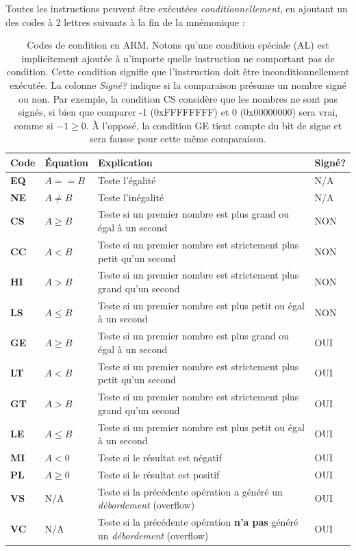 \documentclass{tufte-handout}
\begin{document}
\noindent Toutes les instructions peuvent être exécutées \emph{conditionnellement}, en ajoutant un des codes à 2 lettres suivants à la fin de la mnémonique :
\vspace{-0.8em}
\begin{table}
\begin{tabular}{l|p{2cm}p{6cm}l}
Code & Équation & Explication & Signé? \\ \hline
\textbf{EQ}	& $A == B$ & Teste l'égalité & N/A \\
\textbf{NE}	& $A \neq B$ & Teste l'inégalité & N/A \\ \hline
\textbf{CS}	& $A \geq B$ & Teste si un premier nombre est plus grand ou égal à un second & NON \\
\textbf{CC}	& $A < B$ & Teste si un premier nombre est strictement plus petit qu'un second & NON \\
\textbf{HI}	& $A > B$ & Teste si un premier nombre est strictement plus grand qu'un second & NON \\
\textbf{LS}	& $A \leq B$ & Teste si un premier nombre est plus petit ou égal à un second & NON \\ \hline
\textbf{GE}	& $A \geq B$ & Teste si un premier nombre est plus grand ou égal à un second & OUI \\
\textbf{LT}	& $A < B$ & Teste si un premier nombre est strictement plus petit qu'un second & OUI \\
\textbf{GT}	& $A > B$ & Teste si un premier nombre est strictement plus grand qu'un second & OUI \\
\textbf{LE}	& $A \leq B$ & Teste si un premier nombre est plus petit ou égal à un second & OUI \\ \hline
\textbf{MI}	& $A < 0$ & Teste si le résultat est négatif & OUI \\
\textbf{PL}	& $A \geq 0$ & Teste si le résultat est positif & OUI \\ \hline
\textbf{VS}	& N/A & Teste si la précédente opération a généré un \textit{débordement} (overflow) & OUI \\
\textbf{VC}	& N/A & Teste si la précédente opération \textbf{n'a pas} généré un \textit{débordement} (overflow) & OUI \\ \hline
\end{tabular}
\caption{Codes de condition en ARM. Notons qu'une condition spéciale (AL) est implicitement ajoutée à n'importe quelle instruction ne comportant pas de condition. Cette condition signifie que l'instruction doit être inconditionnellement exécutée. La colonne \textit{Signé?} indique si la comparaison présume un nombre signé ou non. Par exemple, la condition CS considère que les nombres ne sont pas signés, si bien que comparer -1 (0xFFFFFFFF) et 0 (0x00000000) sera vrai, comme si $-1 \geq 0$. À l'opposé, la condition GE tient compte du bit de signe et sera fausse pour cette même comparaison.}
\end{table}
\end{document}
